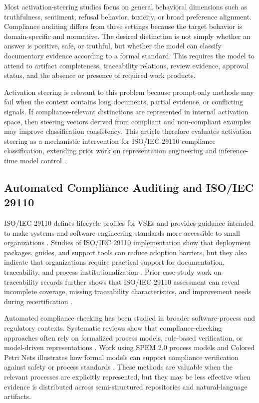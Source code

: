 \documentclass{ieeeaccess}
\begin{document}
Most activation-steering studies focus on general behavioral dimensions such as truthfulness, sentiment, refusal behavior, toxicity, or broad preference alignment. Compliance auditing differs from these settings because the target behavior is domain-specific and normative. The desired distinction is not simply whether an answer is positive, safe, or truthful, but whether the model can classify documentary evidence according to a formal standard. This requires the model to attend to artifact completeness, traceability relations, review evidence, approval status, and the absence or presence of required work products.

Activation steering is relevant to this problem because prompt-only methods may fail when the context contains long documents, partial evidence, or conflicting signals. If compliance-relevant distinctions are represented in internal activation space, then steering vectors derived from compliant and non-compliant examples may improve classification consistency. This article therefore evaluates activation steering as a mechanistic intervention for ISO/IEC 29110 compliance classification, extending prior work on representation engineering and inference-time model control \cite{zou2023representation,turner2023activation,li2023iti}.

\subsection{Automated Compliance Auditing and ISO/IEC 29110}
\label{subsec:rw_compliance_iso}

ISO/IEC 29110 defines lifecycle profiles for VSEs and provides guidance intended to make systems and software engineering standards more accessible to small organizations \cite{iso29110_2024,laporte2016vse}. Studies of ISO/IEC 29110 implementation show that deployment packages, guides, and support tools can reduce adoption barriers, but they also indicate that organizations require practical support for documentation, traceability, and process institutionalization \cite{laporte2015implementation,munoz2020implementations,claudiolapuerta,101145}. Prior case-study work on traceability records further shows that ISO/IEC 29110 assessment can reveal incomplete coverage, missing traceability characteristics, and improvement needs during recertification \cite{terronmacias}.

Automated compliance checking has been studied in broader software-process and regulatory contexts. Systematic reviews show that compliance-checking approaches often rely on formalized process models, rule-based verification, or model-driven representations \cite{castellanos2022processcompliance}. Work using SPEM 2.0 process models and Colored Petri Nets illustrates how formal models can support compliance verification against safety or process standards \cite{castellanos2018spem,sirikrajai2025cpn,tuaycharoen2025auditorviews}. These methods are valuable when the relevant processes are explicitly represented, but they may be less effective when evidence is distributed across semi-structured repositories and natural-language artifacts.
\end{document}
